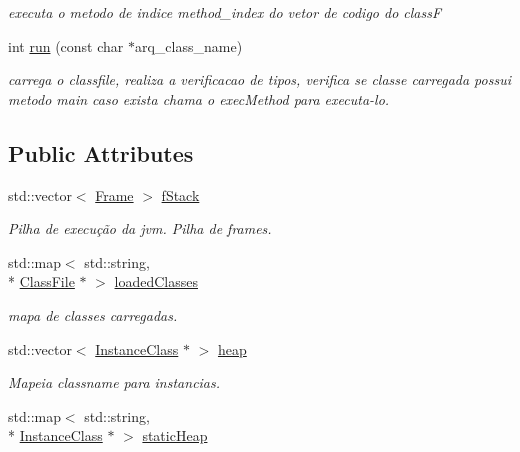 \begin{DoxyCompactItemize}
\begin{DoxyCompactList}\small\item\em executa o metodo de indice method\+\_\+index do vetor de codigo do class\+F \end{DoxyCompactList}\item 
int \hyperlink{classJvm_ac7b36cf9d42be5f4e9fbd1e49f4565d3}{run} (const char $\ast$arq\+\_\+class\+\_\+name)
\begin{DoxyCompactList}\small\item\em carrega o classfile, realiza a verificacao de tipos, verifica se classe carregada possui metodo main caso exista chama o exec\+Method para executa-\/lo. \end{DoxyCompactList}\end{DoxyCompactItemize}
\subsection*{Public Attributes}
\begin{DoxyCompactItemize}
\item 
std\+::vector$<$ \hyperlink{classFrame}{Frame} $>$ \hyperlink{classJvm_ab19406aec3e97ade3d4efbd5796c36f3}{f\+Stack}
\begin{DoxyCompactList}\small\item\em Pilha de execução da jvm. Pilha de frames. \end{DoxyCompactList}\item 
std\+::map$<$ std\+::string, \\*
\hyperlink{classClassFile}{Class\+File} $\ast$ $>$ \hyperlink{classJvm_ac74fb0e170f232ddc32244a1ce7746b7}{loaded\+Classes}
\begin{DoxyCompactList}\small\item\em mapa de classes carregadas. \end{DoxyCompactList}\item 
std\+::vector$<$ \hyperlink{classInstanceClass}{Instance\+Class} $\ast$ $>$ \hyperlink{classJvm_a8e1cdfdf727e1b674a033fbd17337f38}{heap}
\begin{DoxyCompactList}\small\item\em Mapeia classname para instancias. \end{DoxyCompactList}\item 
std\+::map$<$ std\+::string, \\*
\hyperlink{classInstanceClass}{Instance\+Class} $\ast$ $>$ \hyperlink{classJvm_a8852d50533c03dabd4320c27e92d4f1b}{static\+Heap}
\end{DoxyCompactItemize}
